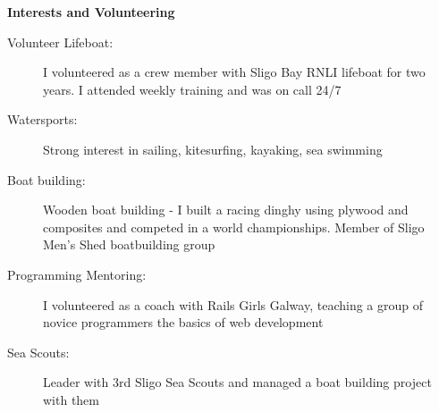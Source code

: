 \documentclass[letterpaper,11pt]{article}
\newcommand{\resheading}[1]{{\large \colorbox{mygrey}{\begin{minipage}{\textwidth}{\textbf{#1 \vphantom{p\^{E}}}}\end{minipage}}}}
\begin{document}
\resheading{Interests and Volunteering}
	\begin{description}
		\item[Volunteer Lifeboat:] I volunteered as a crew member with Sligo Bay RNLI lifeboat for two years. I attended weekly training and was on call 24/7
		\item[Watersports:] Strong interest in sailing, kitesurfing, kayaking, sea swimming
		\item[Boat building:] Wooden boat building - I built a racing dinghy using plywood and composites and competed in a world championships. Member of Sligo Men's Shed boatbuilding group
		\item[Programming Mentoring:] I volunteered as a coach with Rails Girls Galway, teaching a group of novice programmers the basics of web development
		\item[Sea Scouts:] Leader with 3rd Sligo Sea Scouts and managed a boat building project with them

	\end{description} %
\end{document}
